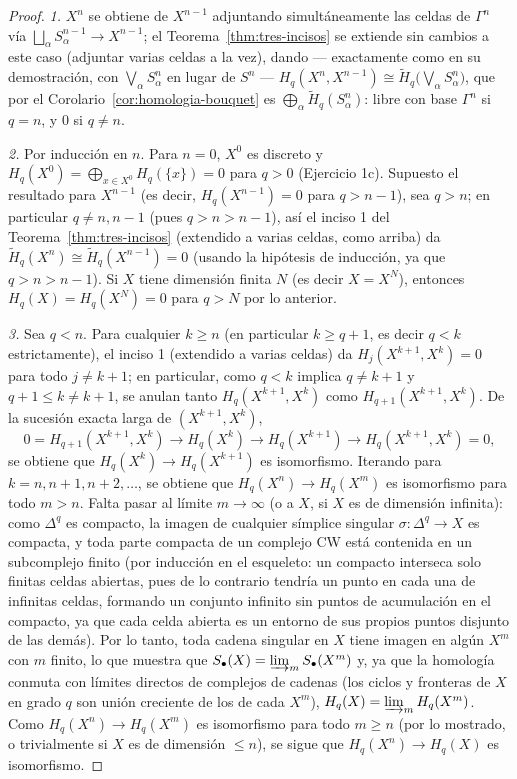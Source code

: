 \documentclass[11pt,a4paper]{article}
\theoremstyle{plain}
\theoremstyle{definition}
\theoremstyle{remark}
\begin{document}
\begin{proof}
\emph{1.} $X^n$ se obtiene de $X^{n-1}$ adjuntando simultáneamente las
celdas de $\Gamma^n$ vía $\bigsqcup_\alpha S^{n-1}_\alpha\to X^{n-1}$; el
Teorema~\ref{thm:tres-incisos} se extiende sin cambios a este caso
(adjuntar varias celdas a la vez), dando --- exactamente como en su
demostración, con $\bigvee_\alpha S^n_\alpha$ en lugar de $S^n$ ---
$H_q(X^n,X^{n-1})\cong\tilde H_q\big(\bigvee_\alpha S^n_\alpha\big)$, que
por el Corolario~\ref{cor:homologia-bouquet} es
$\bigoplus_\alpha\tilde H_q(S^n_\alpha)$: libre con base $\Gamma^n$ si
$q=n$, y $0$ si $q\ne n$.

\emph{2.} Por inducción en $n$. Para $n=0$, $X^0$ es discreto y
$H_q(X^0)=\bigoplus_{x\in X^0}H_q(\{x\})=0$ para $q>0$ (Ejercicio 1c).
Supuesto el resultado para $X^{n-1}$ (es decir, $H_q(X^{n-1})=0$ para
$q>n-1$), sea $q>n$; en particular $q\ne n,n-1$ (pues $q>n>n-1$), así el
inciso 1 del Teorema~\ref{thm:tres-incisos} (extendido a varias celdas,
como arriba) da $\tilde H_q(X^n)\cong\tilde H_q(X^{n-1})=0$ (usando la
hipótesis de inducción, ya que $q>n>n-1$). Si $X$ tiene dimensión
finita $N$ (es decir $X=X^N$), entonces $H_q(X)=H_q(X^N)=0$ para $q>N$
por lo anterior.

\emph{3.} Sea $q<n$. Para cualquier $k\ge n$ (en particular $k\ge q+1$,
es decir $q<k$ estrictamente), el inciso 1 (extendido a varias celdas) da
$H_j(X^{k+1},X^k)=0$ para todo $j\ne k+1$; en particular, como $q<k$
implica $q\ne k+1$ y $q+1\le k\ne k+1$, se anulan tanto
$H_q(X^{k+1},X^k)$ como $H_{q+1}(X^{k+1},X^k)$. De la sucesión exacta
larga de $(X^{k+1},X^k)$,
\[
0=H_{q+1}(X^{k+1},X^k)\to H_q(X^k)\to H_q(X^{k+1})\to H_q(X^{k+1},X^k)=0,
\]
se obtiene que $H_q(X^k)\to H_q(X^{k+1})$ es isomorfismo. Iterando para
$k=n,n+1,n+2,\dots$, se obtiene que $H_q(X^n)\to H_q(X^m)$ es isomorfismo
para todo $m>n$. Falta pasar al límite $m\to\infty$ (o a $X$, si $X$ es de
dimensión infinita): como $\Delta^q$ es compacto, la imagen de cualquier
símplice singular
$\sigma:\Delta^q\to X$ es compacta, y toda parte compacta de un complejo
CW está contenida en un subcomplejo finito (por inducción en el esqueleto:
un compacto interseca solo finitas celdas abiertas, pues de lo contrario
tendría un punto en cada una de infinitas celdas, formando un conjunto
infinito sin puntos de acumulación en el compacto, ya que cada celda
abierta es un entorno de sus propios puntos disjunto de las demás). Por lo
tanto, toda cadena singular en $X$ tiene imagen en algún $X^m$ con $m$
finito, lo que muestra que
$S_\bullet(X)=\varinjlim_mS_\bullet(X^m)$ y, ya que la homología conmuta
con límites directos de complejos de cadenas (los ciclos y fronteras de
$X$ en grado $q$ son unión creciente de los de cada $X^m$),
$H_q(X)=\varinjlim_mH_q(X^m)$. Como $H_q(X^n)\to H_q(X^m)$ es isomorfismo
para todo $m\ge n$ (por lo mostrado, o trivialmente si $X$ es de
dimensión $\le n$), se sigue que $H_q(X^n)\to H_q(X)$ es isomorfismo.


\end{proof}
\end{document}
